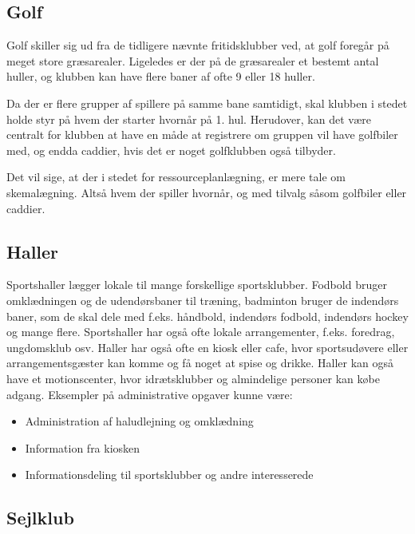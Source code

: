 \subsection{Golf}

Golf skiller sig ud fra de tidligere nævnte fritidsklubber ved, at golf foregår på meget store græsarealer. Ligeledes er
der på de græsarealer et bestemt antal huller, og klubben kan have flere baner af ofte 9 eller 18 huller.

Da der er flere grupper af spillere på samme bane samtidigt, skal klubben i stedet holde styr på hvem der starter
hvornår på 1. hul. 
Herudover, kan det være centralt for klubben at have en måde at registrere om gruppen vil have
golfbiler med, og endda caddier, hvis det er noget golfklubben også tilbyder.

Det vil sige, at der i stedet for ressourceplanlægning, er mere tale om skemalægning. Altså hvem der spiller hvornår, og
med tilvalg såsom golfbiler eller caddier.


\subsection{Haller}

Sportshaller lægger lokale til mange forskellige sportsklubber. Fodbold bruger omklædningen og de udendørsbaner til
træning, badminton bruger de indendørs baner, som de skal dele med f.eks. håndbold, indendørs fodbold, indendørs hockey
og mange flere. Sportshaller har også ofte lokale arrangementer, f.eks. foredrag, ungdomsklub osv. Haller har også ofte
en kiosk eller cafe, hvor sportsudøvere eller arrangementsgæster kan komme og få noget at spise og drikke. Haller kan
også have et motionscenter, hvor idrætsklubber og almindelige personer kan købe adgang\citep{spt_hal}. Eksempler på
administrative opgaver kunne være:

\begin{itemize}
\item Administration af haludlejning og omklædning 
\item Information fra kiosken
\item Informationsdeling til sportsklubber og andre interesserede
\end{itemize}

\subsection{Sejlklub}

